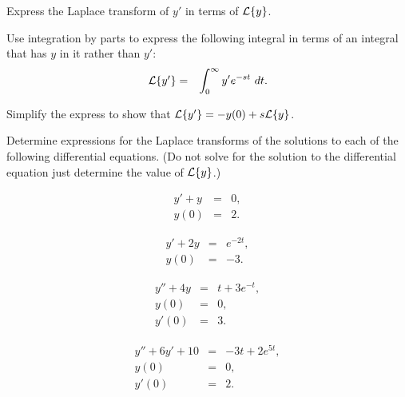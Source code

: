 \begin{problem}
\item Express the Laplace transform of $y'$ in terms of $\laplace{y}$.
  \begin{subproblem}
    \item Use integration by parts to express the following integral
      in terms of an integral that has $y$ in it rather than $y'$:
      \begin{eqnarray*}
        \laplace{y'} & = & \int^\infty_0 y' e^{-st} ~ dt.
      \end{eqnarray*}
      \vfill

    \item Simplify the express to show that $\laplace{y'} = -y(0) + s\laplace{y}$.
      \vfill

  \end{subproblem}


  \clearpage

\item Determine expressions for the Laplace transforms of the
  solutions to each of the following differential equations. (Do not
  solve for the solution to the differential equation just determine
  the value of $\laplace{y}$.)

  \begin{subproblem}
  \item 
    \begin{eqnarray*}
      y' + y & = & 0, \\
      y(0) & = & 2.
    \end{eqnarray*}
    \vfill

  \item 
    \begin{eqnarray*}
      y' + 2y & = & e^{-2t}, \\
      y(0) & = & -3.
    \end{eqnarray*}
    \vfill

  \item 
    \begin{eqnarray*}
      y'' + 4y & = & t + 3e^{-t}, \\
      y(0) & = & 0, \\
      y'(0) & = & 3.
    \end{eqnarray*}
    \vfill

  \item 
    \begin{eqnarray*}
      y'' + 6y' + 10 & = & -3t + 2e^{5t}, \\
      y(0) & = & 0, \\
      y'(0) & = & 2.
    \end{eqnarray*}
    \vfill


  \end{subproblem}


\end{problem}


